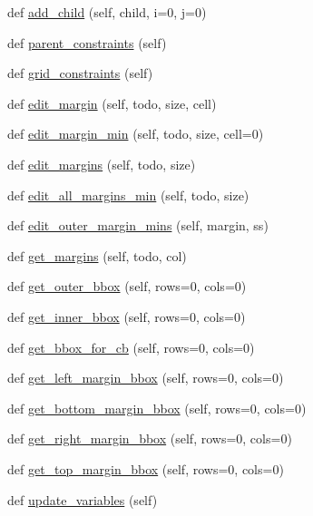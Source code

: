 \begin{DoxyCompactItemize}
\item 
def \hyperlink{classmatplotlib_1_1__layoutgrid_1_1LayoutGrid_a924c3079d3152a284e0d6e8ee0d428ed}{add\+\_\+child} (self, child, i=0, j=0)
\item 
def \hyperlink{classmatplotlib_1_1__layoutgrid_1_1LayoutGrid_afce8330628746415d6394b1cc510e4b4}{parent\+\_\+constraints} (self)
\item 
def \hyperlink{classmatplotlib_1_1__layoutgrid_1_1LayoutGrid_a2392f92b649857e0143e028d84bc7b97}{grid\+\_\+constraints} (self)
\item 
def \hyperlink{classmatplotlib_1_1__layoutgrid_1_1LayoutGrid_a55d3f9acc64853dd72dc6a9bfe4b73e7}{edit\+\_\+margin} (self, todo, size, cell)
\item 
def \hyperlink{classmatplotlib_1_1__layoutgrid_1_1LayoutGrid_a2d219f765779564c03d1f232c635cd01}{edit\+\_\+margin\+\_\+min} (self, todo, size, cell=0)
\item 
def \hyperlink{classmatplotlib_1_1__layoutgrid_1_1LayoutGrid_ae868461e306e4b4ee55a0a6278e96ade}{edit\+\_\+margins} (self, todo, size)
\item 
def \hyperlink{classmatplotlib_1_1__layoutgrid_1_1LayoutGrid_acbb898f9eaf155b26c2605b3c3b200c0}{edit\+\_\+all\+\_\+margins\+\_\+min} (self, todo, size)
\item 
def \hyperlink{classmatplotlib_1_1__layoutgrid_1_1LayoutGrid_a2f48a12036b553c46df46411bb217441}{edit\+\_\+outer\+\_\+margin\+\_\+mins} (self, margin, ss)
\item 
def \hyperlink{classmatplotlib_1_1__layoutgrid_1_1LayoutGrid_aab8f13dc350e0f438c5e723dd2dca931}{get\+\_\+margins} (self, todo, col)
\item 
def \hyperlink{classmatplotlib_1_1__layoutgrid_1_1LayoutGrid_a8eba2da63628a654e3f840ea709bc5db}{get\+\_\+outer\+\_\+bbox} (self, rows=0, cols=0)
\item 
def \hyperlink{classmatplotlib_1_1__layoutgrid_1_1LayoutGrid_a3cbd2702358d4ff4b86ddb23f4be17a1}{get\+\_\+inner\+\_\+bbox} (self, rows=0, cols=0)
\item 
def \hyperlink{classmatplotlib_1_1__layoutgrid_1_1LayoutGrid_abd495d13221a992f867c4a1c62e5dcc3}{get\+\_\+bbox\+\_\+for\+\_\+cb} (self, rows=0, cols=0)
\item 
def \hyperlink{classmatplotlib_1_1__layoutgrid_1_1LayoutGrid_ae72d1ddfb03a8edd1531aff098928c59}{get\+\_\+left\+\_\+margin\+\_\+bbox} (self, rows=0, cols=0)
\item 
def \hyperlink{classmatplotlib_1_1__layoutgrid_1_1LayoutGrid_aa5302af8b938c59eeea3070548c036d1}{get\+\_\+bottom\+\_\+margin\+\_\+bbox} (self, rows=0, cols=0)
\item 
def \hyperlink{classmatplotlib_1_1__layoutgrid_1_1LayoutGrid_a976fee3d76d2f6003e3f83b045f44492}{get\+\_\+right\+\_\+margin\+\_\+bbox} (self, rows=0, cols=0)
\item 
def \hyperlink{classmatplotlib_1_1__layoutgrid_1_1LayoutGrid_a21e8c7edd4b4b93cde516a2751a47719}{get\+\_\+top\+\_\+margin\+\_\+bbox} (self, rows=0, cols=0)
\item 
def \hyperlink{classmatplotlib_1_1__layoutgrid_1_1LayoutGrid_a1b6c6fec0e1cd2c328b02e5e61c5ea53}{update\+\_\+variables} (self)
\end{DoxyCompactItemize}
